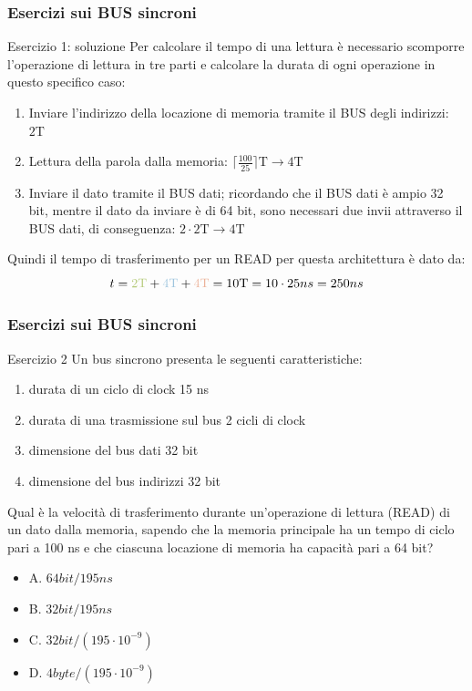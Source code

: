\begin{frame}
	\frametitle{Esercizi sui BUS sincroni}
	
	\begin{block}{Esercizio 1: soluzione}
		Per calcolare il tempo di una lettura è necessario scomporre l'operazione di lettura in tre parti e calcolare la durata di ogni operazione in questo specifico caso:
		\begin{enumerate}
			\item {\color{CpuGreen}Inviare l'indirizzo della locazione di memoria tramite il BUS degli indirizzi: $2\mathrm{T}$}
			\item {\color{CpuBlue}Lettura della parola dalla memoria: $\Big\lceil \frac{100}{25} \Big\rceil \mathrm{T} \rightarrow 4\mathrm{T}$}
			\item {\color{CpuRed} Inviare il dato tramite il BUS dati; ricordando che il BUS dati è ampio 32 bit, mentre il dato da inviare è di 64 bit, sono necessari due invii attraverso il BUS dati, di conseguenza: $2 \cdot 2\mathrm{T} \rightarrow 4\mathrm{T}$}
		\end{enumerate}
		Quindi il tempo di trasferimento per un READ per questa architettura è dato da:
		$$t = {\color{CpuGreen}2\mathrm{T}} + {\color{CpuBlue}4\mathrm{T}} + {\color{CpuRed}4\mathrm{T}} = 10\mathrm{T} = 10 \cdot 25ns = 250ns$$
	\end{block}
\end{frame}


\begin{frame}
	\frametitle{Esercizi sui BUS sincroni}
		
	\begin{block}{Esercizio 2}
		Un bus sincrono presenta le seguenti caratteristiche:
		\begin{scriptsize}
		\begin{enumerate}
			\item durata di un ciclo di clock 15 ns
			\item durata di una trasmissione sul bus 2 cicli di clock
			\item dimensione del bus dati 32 bit
			\item dimensione del bus indirizzi 32 bit
		\end{enumerate}
		\end{scriptsize}
		
		Qual è la velocità di trasferimento durante un’operazione di lettura (READ) di un dato dalla memoria, sapendo che la memoria principale ha un tempo di ciclo pari a 100 ns e che ciascuna locazione di memoria ha capacità pari a 64 bit?
		
		\begin{scriptsize}
		\begin{itemize}
			\item A. $64 bit/195 ns$
			\item B. $32 bit/195 ns$
			\item C. $32 bit/(195 \cdot 10^{-9})$
			\item D. $4 byte/(195 \cdot 10^{-9})$
		\end{itemize}
		\end{scriptsize}
	
	\end{block}
\end{frame}


